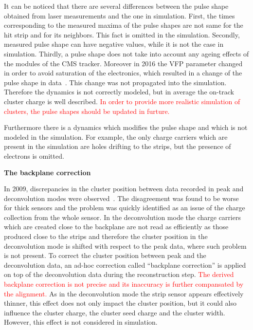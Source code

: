 It can be noticed that there are several differences between the pulse shape obtained from laser measurements and the one in simulation. First, the times corresponding to the measured maxima of the pulse shapes are not same for the hit strip and for its neighbors. This fact is omitted in the simulation. Secondly, measured pulse shape can have negative values, while it is not the case in simulation. Thirdly, a pulse shape does not take into account any ageing effects of the modules of the CMS tracker. Moreover in 2016 the VFP parameter changed in order to avoid saturation of the electronics, which resulted in a change of the pulse shape in data~\cite{website:vfp}. This change was not propagated into the simulation. Therefore the dynamics is not correctly modeled, but in average the on-track cluster charge is well described. \textcolor{red}{In order to provide more realistic simulation of clusters, the pulse shapes should be updated in furture.} 

Furthermore there is a dynamics which modifies the pulse shape and which is not modeled in the simulation. For example, the only charge carriers which are present in the simulation are holes drifting to the strips, but the presence of electrons is omitted.

\textbf{The backplane correction}

In 2009, discrepancies in the cluster position between data recorded in peak and deconvolution modes were observed~\cite{website:backplane}. The disagreement was found to be worse for thick sensors and the problem was quickly identified as an issue of the charge collection from the whole sensor. In the deconvolution mode the charge carriers which are created close to the backplane are not read as efficiently as those produced close to the strips and therefore the cluster position in the deconvolution mode is shifted with respect to the peak data, where such problem is not present. To correct the cluster position between peak and the deconvolution data, an ad-hoc correction called ``backplane correction'' is applied on top of the deconvolution data during the reconstruction step. \textcolor{red}{The derived backplane correction is not precise and its inaccuracy is further compansated by the alignment.} As in the deconvolution mode the strip sensor appears effectively thinner, this effect does not only impact the cluster position, but it could also influence the cluster charge, the cluster seed charge and the cluster width. However, this effect is not considered in simulation.

